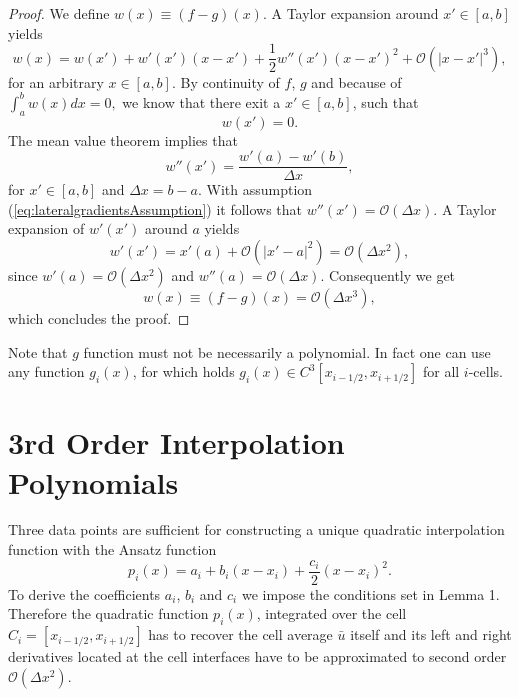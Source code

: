\documentclass[10pt,a4paper]{article}
\begin{document}
\begin{proof}
We define $w(x)\equiv (f-g)(x)$. A Taylor expansion around $x'\in[a,b]$ yields
%
\begin{equation}
	w(x) = w(x') + w'(x')(x-x') + \frac{1}{2}w''(x')(x-x')^2 + \mathcal{O}(|x-x'|^3),
\end{equation}
%
for an arbitrary $x\in[a,b]$. By continuity of $f$, $g$ and because of $\int_{a}^{b} w(x)dx=0,$ we know that there exit a $x'\in[a,b]$, such that
%
\begin{equation}
	w(x') = 0.
\end{equation}
%
The mean value theorem implies that
%
\begin{equation}
	w''(x') = \frac{w'(a)-w'(b)}{\Delta x},
\end{equation}
%
for $x'\in[a,b]$ and $\Delta x=b-a$. With assumption (\ref{eq:lateralgradientsAssumption}) it follows that $w''(x') = \mathcal{O}(\Delta x)$. A Taylor expansion of $w'(x')$ around $a$ yields
%
\begin{equation}
	w'(x') = x'(a) + \mathcal{O}(|x'-a|^2) = \mathcal{O}(\Delta x^2),
\end{equation}
%
since $w'(a)=\mathcal{O}(\Delta x^2)$ and $w''(a) = \mathcal{O}(\Delta x)$. Consequently we get
%
\begin{equation}
	w(x)\equiv(f-g)(x)=\mathcal{O}(\Delta x^3),
\end{equation}
%
which concludes the proof. 
\end{proof}
%
Note that $g$ function must not be necessarily a polynomial. In fact one can use any function $g_i(x)$, for which holds $g_i(x)\in C^3[x_{i-1/2},x_{i+1/2}]$ for all $i$-cells.


\section{3rd Order Interpolation Polynomials}
\label{sec:IP}

Three data points are sufficient for constructing a unique quadratic interpolation function with the Ansatz function 
%
\begin{equation}
	p_i(x)=a_i+b_i(x-x_i)+\frac{c_i}{2}(x-x_i)^2.
	\label{eq:AnsatzPolynomial}
\end{equation}
%
To derive the coefficients $a_i$, $b_i$ and $c_i$ we impose the conditions set in Lemma 1. Therefore the quadratic function $p_i(x)$, integrated over the cell $C_i = [x_{i-1/2},x_{i+1/2}]$ has to recover the cell average $\bar{u}$ itself and its left and right derivatives located at the cell interfaces have to be approximated to second order $\mathcal{O}(\Delta x^2)$.
\end{document}
